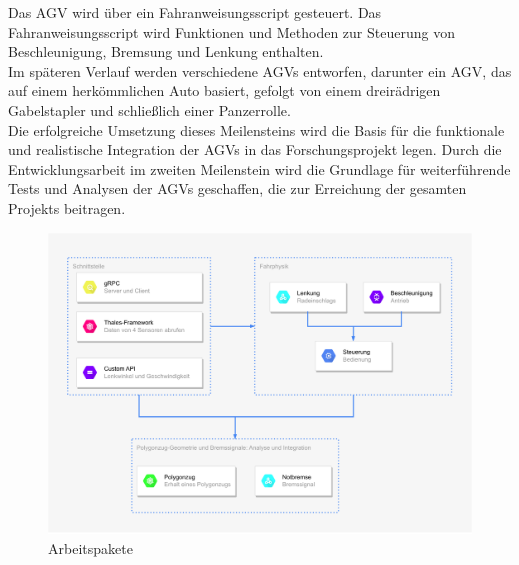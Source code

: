 Das AGV wird über ein Fahranweisungsscript gesteuert. Das Fahranweisungsscript wird Funktionen und Methoden zur Steuerung von Beschleunigung, Bremsung und Lenkung enthalten.\\

Im späteren Verlauf werden verschiedene AGVs entworfen, darunter ein AGV, das auf einem herkömmlichen Auto basiert, gefolgt von einem dreirädrigen Gabelstapler und schließlich einer Panzerrolle.\\
Die erfolgreiche Umsetzung dieses Meilensteins wird die Basis für die funktionale und realistische Integration der AGVs in das Forschungsprojekt legen. Durch die Entwicklungsarbeit im zweiten Meilenstein wird die Grundlage für weiterführende Tests und Analysen der AGVs geschaffen, die zur Erreichung der gesamten Projekts beitragen.\\



\begin{figure}[h]
    \centering
    \includegraphics[width=15cm, page=1]{images/Poly.pdf}
    \caption{Arbeitspakete}
    \label{fig:Arbeitspaket}
\end{figure}

